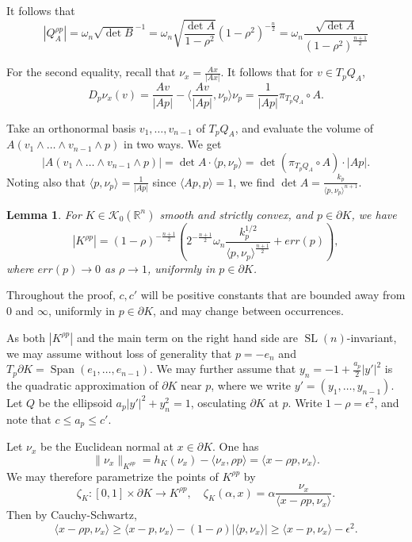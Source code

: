 \documentclass[reqno,10pt]{amsart}
\newtheorem{Lemma}[Proposition]{Lemma}
\DeclareMathOperator{\Span}{Span}
\DeclareMathOperator{\SL}{SL}
\newcommand{\R}{\mathbb{R}}
\begin{document}
It follows that
$$|Q_A^{\rho p}|=\omega_n\sqrt{\det B}^{-1}=\omega_n\sqrt{\frac{\det A}{1-\rho^2}}(1-\rho^2)^{-\frac{n}{2}}=\omega_n\frac{\sqrt{\det A}}{(1-\rho^2)^{\frac{n+1}{2}}}$$

For the second equality, recall that $\nu_x=\frac{Ax}{|Ax|}$. It follows that for $v\in T_pQ_A$, $$D_p\nu_x (v)=\frac{Av}{|Ap|}-\langle \frac{Av}{|Ap|}, \nu_p\rangle \nu_p=\frac{1}{|Ap|}\pi_{T_pQ_A}\circ A.$$

Take an orthonormal basis $v_1,\dots, v_{n-1}$ of $T_pQ_A$, and evaluate the volume of $A(v_1\wedge\dots\wedge v_{n-1}\wedge p)$ in two ways. We get $$|A(v_1\wedge\dots\wedge v_{n-1}\wedge p)|=\det A\cdot\langle p, \nu_p\rangle=\det(\pi_{T_pQ_A}\circ A)\cdot|Ap|.$$
Noting also that $\langle p, \nu_p\rangle=\frac{1}{|Ap|}$ since $\langle Ap, p\rangle =1$, we find
$\det A=\frac{k_p}{\langle p, \nu_p\rangle^{n+1}}.$
\endproof


\begin{Lemma}\label{lem:dual_volume}
	For $K\in\mathcal K_0(\R^n)$ smooth and strictly convex, and $p\in \partial K$, we have $$|K^{\rho p}|=  (1-\rho)^{-\frac{n+1}{2}}\left(2^{-\frac{n+1}{2}} \omega_n \frac{k_p^{1/2}}{\langle p,\nu_p\rangle^{\frac{n+1}{2}}}+err(p)\right),$$
	where $err(p)\to 0$ as $\rho\to 1$, uniformly in $p\in\partial K$.
\end{Lemma}
\proof
Throughout the proof, $c,c'$ will be positive constants that are bounded away from $0$ and $\infty$, uniformly in $p\in\partial K$, and may change between occurrences.

As both $|K^{\rho p}|$ and the main term on the right hand side are $\SL(n)$-invariant, we may assume without loss of generality that $p=-e_n$ and $T_p\partial K=\Span(e_1,\dots,e_{n-1})$. We may further assume that $y_{n}=-1+\frac {a_p} 2|y'|^2$ is the quadratic approximation of $\partial K$ near $p$, where we write $y'=(y_1,\dots,y_{n-1})$. Let $Q$ be the ellipsoid $a_p|y'|^2 +y_n^2=1$, osculating $\partial K$ at $p$. Write $1-\rho =\epsilon^2$, and note that $c\leq a_p\leq c'$.

Let $\nu_x$ be the Euclidean normal at $x\in\partial K$. One has 
\[\|\nu_x\|_{K^{\rho p}}=h_K(\nu_x)-\langle \nu_x,\rho p\rangle=\langle x-\rho p, \nu_x\rangle. \]
We may therefore parametrize the points of $K^{\rho p}$ by $$\zeta_K:[0,1]\times\partial K\to K^{\rho p}, \quad \zeta_K(\alpha, x)=\alpha\frac{\nu_x}{\langle x-\rho p, \nu_x\rangle}.$$
 Then by Cauchy-Schwartz,
$$\langle x-\rho p, \nu_x\rangle\geq \langle x-p, \nu_x\rangle -(1-\rho)|\langle p, \nu_x\rangle| \geq  \langle x-p, \nu_x\rangle- \epsilon^2.$$
\end{document}
